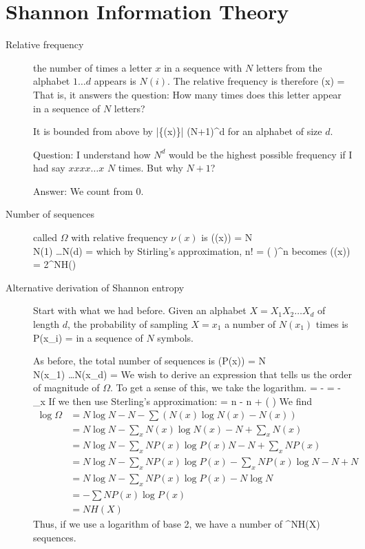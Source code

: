 \section{Shannon Information Theory}
\begin{description}

\item[Relative frequency] the number of times a letter $x$ in a sequence with $N$ letters from the alphabet $1\ldots d$ appears is $N(i)$. The relative frequency is therefore 
\beq
\nu(x) = 
\eeq
That is, it answers the question: How many times does this letter appear in a sequence of $N$ letters? 

It is bounded from above by 
\beq
|\{\nu(x)\}| \leq (N+1)^d
\eeq
for an alphabet of size $d$. 

Question: I understand how $N^d$ would be the highest possible frequency if I had say $xxxx\ldots x$ $N$ times. But why $N +1$? 

Answer: We count from 0. 

\item[Number of sequences] called $\Omega$ with relative frequency $\nu(x)$ is 
\beq
\Omega(\nu(x)) = \bpmat N \\ N(1) \ldots N(d) \epmat = 
\eeq
which by Stirling's approximation, 
\beq
n! =  \left(  \right)^n 
\eeq
becomes
\beq
\Omega(\nu(x)) =  2^{NH(\nu)}
\eeq


\item[Alternative derivation of Shannon entropy]
Start with what we had before. Given an alphabet $X = X_1 X_2 \ldots X_d$ of length $d$, the probability of sampling $X = x_1$ a number of $N(x_1)$ times is
\beq
P(x_i) = 
\eeq
in a sequence of $N$ symbols. 

As before, the total number of sequences is
\beq
\Omega(P(x)) = \bpmat N\\ N(x_1) \ldots N(x_d) \epmat = 
\eeq
We wish to derive an expression that tells us the order of magnitude of $\Omega$. To get a sense of this, we take the logarithm.
\beq
\log{\Omega} =   -  =  - \sum_x 
\eeq
If we then use Sterling's approximation:
\beq
{} = n - n + ( )
\eeq
We find
\begin{align}
\log{\Omega} &= N \log{N} - N - \sum \left( N(x) \log{N(x)} - N(x) \right) \nonumber \\
&= N \log{N} - \sum_x N(x) \log{N(x)} - N +\sum_x N(x) \nonumber \\
&= N \log{N} - \sum_x NP(x) \log{P(x) N} - N + \sum_x NP(x) \nonumber \\
&= N\log{N} - \sum_x NP(x) \log{P(x)}	- \sum_x NP(x) \log{N} - N +N \nonumber \\
&= N \log{N} - \sum_x NP(x) \log{P(x)} - N\log{N} \nonumber \\
&= - \sum NP(x) \log{P(x)} \nonumber \\
&= NH(X)
\end{align}
Thus, if we use a logarithm of base 2, we have a number of 
^{NH(X)}
\eeq
sequences. 


\end{description}
